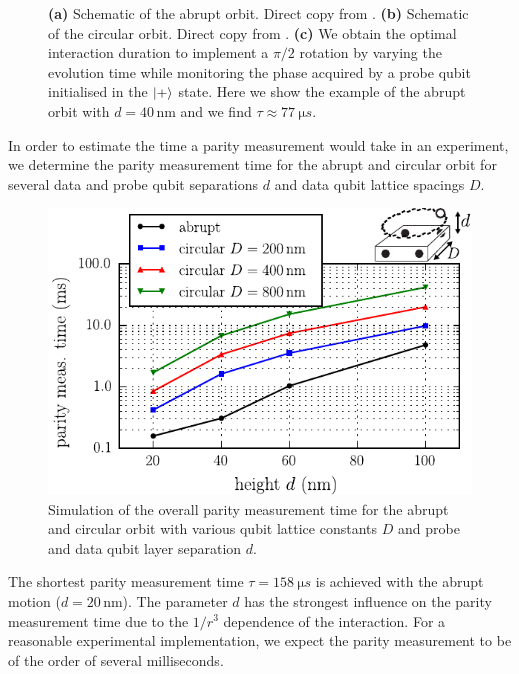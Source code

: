 \begin{figure}[H]
	\caption{\textbf{(a)} Schematic of the abrupt orbit. Direct copy from \cite{OGorman2016}. \textbf{(b)} Schematic of the circular orbit. Direct copy from \cite{OGorman2016}. \textbf{(c)} We obtain the optimal interaction duration to implement a $\pi/2$ rotation by varying the evolution time while monitoring the phase acquired by a probe qubit initialised in the $\ket{+}$ state. Here we show the example of the abrupt orbit with $d=40\, $nm and we find $\tau\approx \SI{77}{\micro s}$.}
	\label{FIG:abrupt_tau}
\end{figure}

In order to estimate the time a parity measurement would take in an experiment, we determine the parity measurement time for the abrupt and circular orbit for several data and probe qubit separations $d$ and data qubit lattice spacings $D$.

\begin{figure}[H]
	\includegraphics[width=\linewidth]{../Figures/tau_d_D}
	\caption{Simulation of the overall parity measurement time for the abrupt and circular orbit with various qubit lattice constants $D$ and probe and data qubit layer separation $d$.}
	\label{FIG:tau}
\end{figure}

The shortest parity measurement time $\tau=\SI{158}{\micro s}$ is achieved with the abrupt motion ($d=20\, $nm).
The parameter $d$ has the strongest influence on the parity measurement time due to the $1/r^3$ dependence of the interaction.
For a reasonable experimental implementation, we expect the parity measurement to be of the order of several milliseconds.

 
